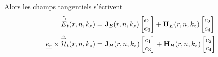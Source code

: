     \begin{prop}
        Alors les champs tangentiels s'écrivent
        \begin{subequations}
            \begin{align}
                \hat {{\overset{\rightarrow}{E}}}_t(r,n,k_z) &= \mathbf{J}_{E}(r,n,k_z)
                \begin{bmatrix}
                    c_1 \\
                    c_3
                \end{bmatrix}
                +
                \mathbf{H}_{E}(r,n,k_z)
                \begin{bmatrix}
                    c_2 \\
                    c_4
                \end{bmatrix}
                \label{eq:imp_fourier:cylindre:Et}\\
                \underline{e_r}\times\hat {{\overset{\rightarrow}{\mathcal{H}}}}_t(r,n,k_z) &= 
                \mathbf{J}_{H}(r,n,k_z)
                \begin{bmatrix}
                    c_1 \\
                    c_3
                \end{bmatrix}
                +
                \mathbf{H}_{H}(r,n,k_z)
                \begin{bmatrix}
                    c_2 \\
                    c_4
                \end{bmatrix}
                \label{eq:imp_fourier:cylindre:Ht}
            \end{align}
        \end{subequations}
    \end{prop}


